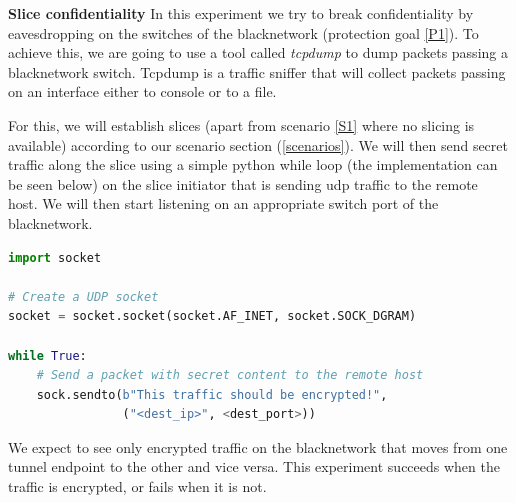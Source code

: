 \begin{description}[style=multiline, labelwidth=0.7cm]
    \item[\namedlabel{E4}{E4}] \textbf{Slice confidentiality} In this experiment we try to break confidentiality by eavesdropping on the switches of the \gls{blacknetwork} (protection goal \ref{P1}). To achieve this, we are going to use a tool called \textit{tcpdump} \cite{tcpdump} to dump packets passing a \gls{blacknetwork} switch. Tcpdump is a traffic sniffer that will collect packets passing on an interface either to console or to a file.

    For this, we will establish slices (apart from scenario \ref{S1} where no slicing is available) according to our scenario section (\ref{scenarios}). We will then send secret traffic along the slice using a simple python while loop (the implementation can be seen below) on the slice initiator that is sending \acrshort{udp} traffic to the remote host. We will then start listening on an appropriate switch port of the \gls{blacknetwork}.
\newpage
    \begin{lstlisting}[language=python]
import socket

# Create a UDP socket
socket = socket.socket(socket.AF_INET, socket.SOCK_DGRAM)

while True:
    # Send a packet with secret content to the remote host
    sock.sendto(b"This traffic should be encrypted!",
                ("<dest_ip>", <dest_port>))
    \end{lstlisting}

    We expect to see only encrypted traffic on the \gls{blacknetwork} that moves from one tunnel endpoint to the other and vice versa. This experiment succeeds when the traffic is encrypted, or fails when it is not.




\end{description}
